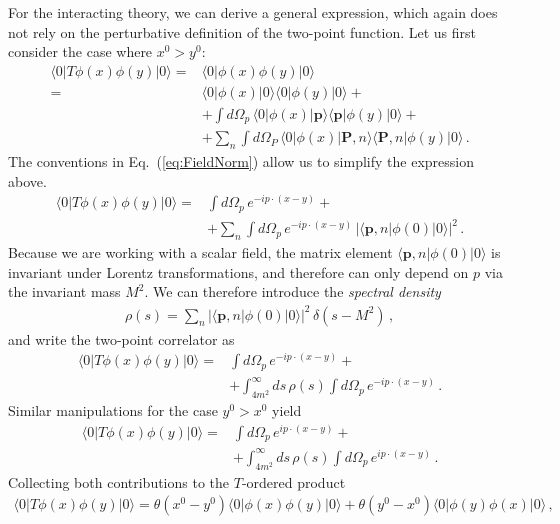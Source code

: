 For the interacting theory, we can derive a general expression, which
again does not rely on the perturbative definition of the two-point
function. Let us first consider the case where $x^0>y^0$:
\begin{align}
  \langle 0| T \phi(x) \phi(y) |0\rangle
  =& \langle 0| \phi(x) \phi(y) |0\rangle \nonumber \\
  =& \langle 0| \phi(x) |0\rangle \langle 0 | \phi(y) |0\rangle +
     \nonumber \\
  &+ \int d\Omega_p\, \langle 0| \phi(x)| \mathbf{p}\rangle
    \langle \mathbf{p} | \phi(y) |0\rangle + \nonumber \\
  &+ \sum_n \int d\Omega_P\, \langle 0| \phi(x) |\mathbf{P}, n\rangle
    \langle \mathbf{P}, n |\phi(y) |0\rangle\, .
\end{align}
The conventions in Eq.~(\ref{eq:FieldNorm}) allow us to simplify the
expression above.
\begin{align}
  \langle 0| T \phi(x) \phi(y) |0\rangle
  =& \int d\Omega_p\, e^{-ip\cdot (x-y)} + \nonumber \\
   &+ \sum_n \int d\Omega_p\, e^{-ip\cdot (x-y)}\, \left|
    \langle \mathbf{p}, n |\phi(0) |0\rangle \right|^2 \, .
\end{align}
Because we are working with a scalar field, the matrix element
$\langle \mathbf{p}, n |\phi(0) |0\rangle$ is invariant under Lorentz
transformations, and therefore can only depend on $p$ via the
invariant mass $M^2$. We can therefore introduce the {\em spectral
  density}
\begin{align}
  \label{eq:SpecDen}
  \rho(s) = \sum_n \left|
    \langle \mathbf{p}, n |\phi(0) |0\rangle \right|^2 \, 
  \delta(s-M^2)\, ,
\end{align}
and write the two-point correlator as
\begin{align}
  \langle 0| T \phi(x) \phi(y) |0\rangle
  =& \int d\Omega_p\, e^{-ip\cdot (x-y)} + \nonumber \\
   &+ \int_{4m^2}^\infty ds\, \rho(s) \int d\Omega_p\,  e^{-ip\cdot
     (x-y)}\, .
\end{align}
Similar manipulations for the case $y^0>x^0$ yield
\begin{align}
  \langle 0| T \phi(x) \phi(y) |0\rangle
  =& \int d\Omega_p\, e^{ip\cdot (x-y)} + \nonumber \\
   &+ \int_{4m^2}^\infty ds\, \rho(s) \int d\Omega_p\,  e^{ip\cdot
     (x-y)}\, .
\end{align}
Collecting both contributions to the $T$-ordered product 
\begin{align}
  \langle 0| T \phi(x) \phi(y) |0\rangle
  = \theta(x^0-y^0)  \langle 0| \phi(x) \phi(y) |0\rangle
  + \theta(y^0-x^0)  \langle 0| \phi(y) \phi(x) |0\rangle\, ,
\end{align}
